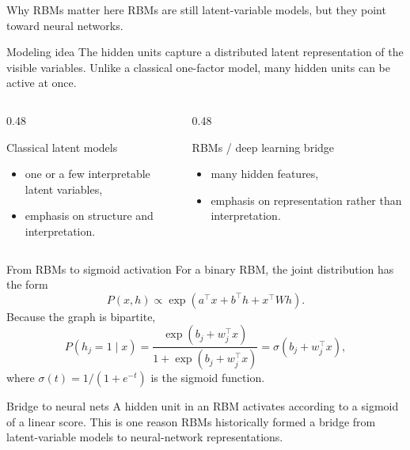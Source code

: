 \documentclass[dvipsnames,aspectratio=169,handout]{beamer}
\begin{document}
\begin{frame}{Why RBMs matter here}
RBMs are still latent-variable models, but they point toward neural networks.

\begin{block}{Modeling idea}
The hidden units capture a distributed latent representation of the visible variables.
Unlike a classical one-factor model, many hidden units can be active at once.
\end{block}

\begin{columns}[T]
\begin{column}{0.48\textwidth}
\begin{block}{Classical latent models}
\begin{itemize}
    \item one or a few interpretable latent variables,
    \item emphasis on structure and interpretation.
\end{itemize}
\end{block}
\end{column}
\begin{column}{0.48\textwidth}
\begin{block}{RBMs / deep learning bridge}
\begin{itemize}
    \item many hidden features,
    \item emphasis on representation rather than interpretation.
\end{itemize}
\end{block}
\end{column}
\end{columns}
\end{frame}

\begin{frame}{From RBMs to sigmoid activation}
For a binary RBM, the joint distribution has the form
\[
P(x,h) \propto \exp\!\left( a^\top x + b^\top h + x^\top W h \right).
\]
Because the graph is bipartite,
\[
P(h_j=1\mid x)
= \frac{\exp(b_j + w_j^\top x)}{1+\exp(b_j + w_j^\top x)}
= \sigma(b_j+w_j^\top x),
\]
where $\sigma(t)=1/(1+e^{-t})$ is the sigmoid function.

\begin{alertblock}{Bridge to neural nets}
A hidden unit in an RBM activates according to a sigmoid of a linear score.
This is one reason RBMs historically formed a bridge from latent-variable models to neural-network representations.
\end{alertblock}
\end{frame}
\end{document}
